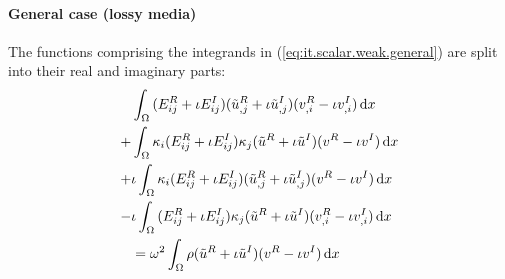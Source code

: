 \paragraph{General case (lossy media)} The functions comprising the integrands in (\ref{eq:it.scalar.weak.general}) are split into their real and imaginary parts:
%
\begin{align}
    & \int_{\Omega} {
        (E^R_{ij} + \iota E^I_{ij})
        (\tilde{u}^R_{,j} + \iota \tilde{u}^I_{,j})
        (v^R_{,i} - \iota v^I_{,i})
        \,\mathrm{d}x
    } \nonumber \\
    +& \int_{\Omega} {
        \kappa_{i}
        (E^R_{ij} + \iota E^I_{ij})
        \kappa_{j}
        (\tilde{u}^R + \iota \tilde{u}^I)
        (v^R - \iota v^I)
        \,\mathrm{d}x
    } \nonumber \\
    + & \iota \int_{\Omega} {
    \kappa_{i}
    (E^R_{ij} + \iota E^I_{ij})
    (\tilde{u}^R_{,j} + \iota \tilde{u}^I_{,j})
    (v^R - \iota v^I)
    \,\mathrm{d}x
    } \nonumber \\
    - & \iota \int_{\Omega} {
        (E^R_{ij} + \iota E^I_{ij})
        \kappa_{j}
        (\tilde{u}^R + \iota \tilde{u}^I)
        (v^R_{,i} - \iota v^I_{,i})
        \,\mathrm{d}x
    } \nonumber \\
    &=
    \omega^2 \int_{\Omega} {
        \rho
        (\tilde{u}^R + \iota \tilde{u}^I)
        (v^R - \iota v^I)
        \,\mathrm{d}x
    } \nonumber
\end{align}
%
